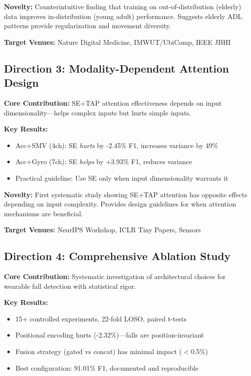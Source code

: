 \documentclass{article}
\begin{document}
\textbf{Novelty:} Counterintuitive finding that training on out-of-distribution (elderly) data improves in-distribution (young adult) performance. Suggests elderly ADL patterns provide regularization and movement diversity.

\textbf{Target Venues:} Nature Digital Medicine, IMWUT/UbiComp, IEEE JBHI

\subsection{Direction 3: Modality-Dependent Attention Design}

\textbf{Core Contribution:} SE+TAP attention effectiveness depends on input dimensionality---helps complex inputs but hurts simple inputs.

\textbf{Key Results:}
\begin{itemize}
    \item Acc+SMV (4ch): SE \textit{hurts} by -2.45\% F1, increases variance by 49\%
    \item Acc+Gyro (7ch): SE \textit{helps} by +3.93\% F1, reduces variance
    \item Practical guideline: Use SE only when input dimensionality warrants it
\end{itemize}

\textbf{Novelty:} First systematic study showing SE+TAP attention has opposite effects depending on input complexity. Provides design guidelines for when attention mechanisms are beneficial.

\textbf{Target Venues:} NeurIPS Workshop, ICLR Tiny Papers, Sensors

\subsection{Direction 4: Comprehensive Ablation Study}

\textbf{Core Contribution:} Systematic investigation of architectural choices for wearable fall detection with statistical rigor.

\textbf{Key Results:}
\begin{itemize}
    \item 15+ controlled experiments, 22-fold LOSO, paired t-tests
    \item Positional encoding hurts (-2.32\%)---falls are position-invariant
    \item Fusion strategy (gated vs concat) has minimal impact ($<$0.5\%)
    \item Best configuration: 91.01\% F1, documented and reproducible
\end{itemize}
\end{document}
